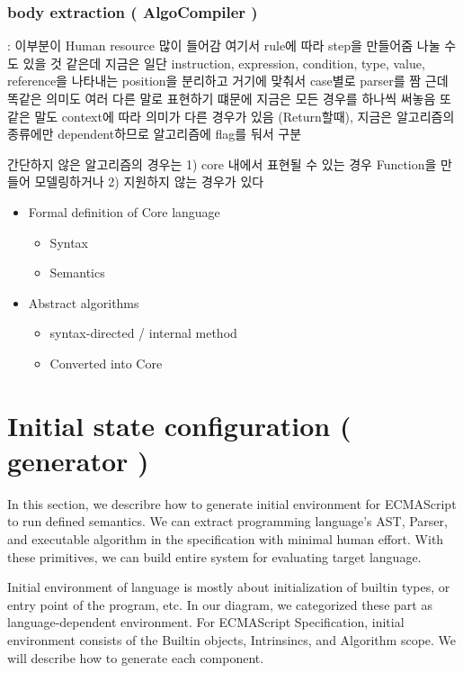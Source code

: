 \subsubsection{body extraction ( AlgoCompiler )} : 이부분이 Human resource 많이 들어감
여기서 rule에 따라 step을 만들어줌
나눌 수도 있을 것 같은데 지금은 일단 instruction, expression, condition, type, value, reference을 나타내는 position을 분리하고 거기에 맞춰서 case별로 parser를 짬
근데 똑같은 의미도 여러 다른 말로 표현하기 떄문에 지금은 모든 경우를 하나씩 써놓음
또 같은 말도 context에 따라 의미가 다른 경우가 있음 (Return할때), 지금은 알고리즘의 종류에만 dependent하므로 알고리즘에 flag를 둬서 구분

간단하지 않은 알고리즘의 경우는 1) core 내에서 표현될 수 있는 경우 Function을 만들어 모델링하거나 
2) 지원하지 않는 경우가 있다


\begin{itemize}
  \item Formal definition of Core language
    \begin{itemize}
      \item Syntax
      \item Semantics
    \end{itemize}
  \item Abstract algorithms
    \begin{itemize}
      \item syntax-directed / internal method
      \item Converted into Core
    \end{itemize}
\end{itemize}

\section{ Initial state configuration ( generator ) }

In this section, we describre how to generate initial environment for ECMAScript to run defined semantics. 
We can extract programming language's AST, Parser, and executable algorithm in the specification with minimal human effort.
With these primitives, we can build entire system for evaluating target language.

Initial environment of language is mostly about initialization of builtin types, or entry point of the program, etc.
In our diagram, we categorized these part as language-dependent environment.
For ECMAScript Specification, initial environment consists of the Builtin objects, Intrinsincs, and Algorithm scope. We will describe how to generate each component.

